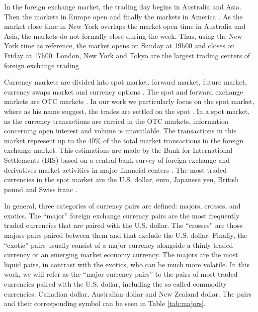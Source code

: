 In the foreign exchange market, the trading day begins in Australia and Asia.
Then the markets in Europe open and finally the markets in America
\cite{forex_structure,forex_market_micro,book_forex_2,book_forex_3}. As the
market close time in New York overlaps the market open time in Australia and
Asia, the markets do not formally close during the week. Thus, using the New
York time as reference, the market opens on Sunday at 19h00 and closes on
Friday at 17h00. London, New York and Tokyo are the largest trading centers of
foreign exchange trading \cite{book_forex_4}

Currency markets are divided into spot market, forward market, future market,
currency swaps market and currency options
\cite{book_forex_2,book_forex_3,book_forex_4}. The spot and forward exchange
markets are OTC markets \cite{book_forex}. In our work we particularly focus on
the spot market, where as his name suggest, the trades are settled on the spot
\cite{book_forex,book_forex_3}. In a spot market, as the currency transactions
are carried in the OTC markets, information concerning open interest and volume
is unavailable. The transactions in this market represent up to the 40\% of the
total market transactions in the foreign exchange market. This estimations are
made by the Bank for International Settlements (BIS) based on a central bank
survey of foreign exchange and derivatives market activities in major financial
centers \cite{bis}. The most traded currencies in the spot market are the U.S.
dollar, euro, Japanese yen, British pound and Swiss franc \cite{book_forex}.

In general, three categories of currency pairs are defined: majors, crosses,
and exotics. The ``major'' foreign exchange currency pairs are the most
frequently traded currencies that are paired with the U.S. dollar. The
``crosses'' are those majors pairs paired between them and that exclude the
U.S. dollar. Finally, the ``exotic'' pairs usually consist of a major currency
alongside a thinly traded currency or an emerging market economy currency. The
majors are the most liquid pairs, in contrast with the exotics, who can be much
more volatile. In this work, we will refer as the ``major currency pairs'' to
the pairs of most traded currencies paired with the U.S. dollar, including the
so called commodity currencies: Canadian dollar, Australian dollar and New
Zealand dollar. The pairs and their corresponding symbol can be seen in Table
\ref{tab:majors}.

